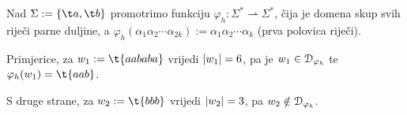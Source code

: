 
\begin{primjer}[{name=[funkcija koja riječi parne duljine preslikava u prvu polovicu]}]\label{pr:pola}
Nad $\Sigma:=\{\t a,\t b\}$ promotrimo funkciju $\varphi_h:\Sigma^*\rightharpoonup\Sigma^*$, čija je domena skup svih riječi parne duljine, a $\varphi_h(\alpha_1\alpha_2\dotsm\alpha_{2k}):=\alpha_1\alpha_2\dotsm\alpha_k$ (prva polovica riječi).
	
	Primjerice, za $w_1:=\t{aababa}$ vrijedi $\lvert w_1\rvert=6$, pa je $w_1\in\mathcal D_{\varphi_h}$\! te $\varphi_h(w_1)=\t{aab}$.

	S druge strane, za $w_2:=\t{bbb}$ vrijedi $\lvert w_2\rvert=3$, pa $w_2\notin\mathcal D_{\varphi_h}$.


\end{primjer}
